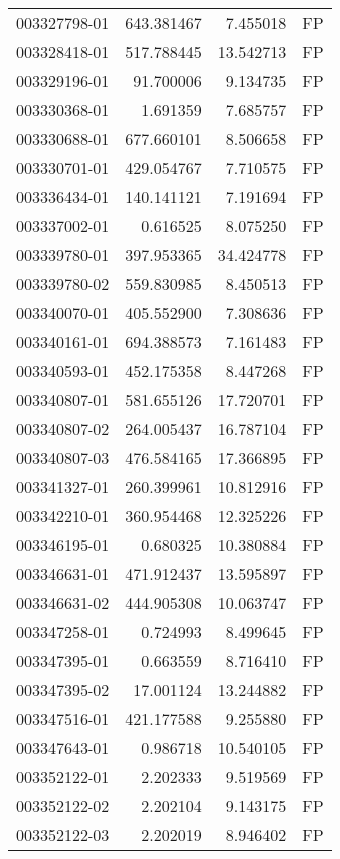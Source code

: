 \begin{tabular}{lrrl}
003327798-01 &  643.381467 &     7.455018 &   FP \\
003328418-01 &  517.788445 &    13.542713 &   FP \\
003329196-01 &   91.700006 &     9.134735 &   FP \\
003330368-01 &    1.691359 &     7.685757 &   FP \\
003330688-01 &  677.660101 &     8.506658 &   FP \\
003330701-01 &  429.054767 &     7.710575 &   FP \\
003336434-01 &  140.141121 &     7.191694 &   FP \\
003337002-01 &    0.616525 &     8.075250 &   FP \\
003339780-01 &  397.953365 &    34.424778 &   FP \\
003339780-02 &  559.830985 &     8.450513 &   FP \\
003340070-01 &  405.552900 &     7.308636 &   FP \\
003340161-01 &  694.388573 &     7.161483 &   FP \\
003340593-01 &  452.175358 &     8.447268 &   FP \\
003340807-01 &  581.655126 &    17.720701 &   FP \\
003340807-02 &  264.005437 &    16.787104 &   FP \\
003340807-03 &  476.584165 &    17.366895 &   FP \\
003341327-01 &  260.399961 &    10.812916 &   FP \\
003342210-01 &  360.954468 &    12.325226 &   FP \\
003346195-01 &    0.680325 &    10.380884 &   FP \\
003346631-01 &  471.912437 &    13.595897 &   FP \\
003346631-02 &  444.905308 &    10.063747 &   FP \\
003347258-01 &    0.724993 &     8.499645 &   FP \\
003347395-01 &    0.663559 &     8.716410 &   FP \\
003347395-02 &   17.001124 &    13.244882 &   FP \\
003347516-01 &  421.177588 &     9.255880 &   FP \\
003347643-01 &    0.986718 &    10.540105 &   FP \\
003352122-01 &    2.202333 &     9.519569 &   FP \\
003352122-02 &    2.202104 &     9.143175 &   FP \\
003352122-03 &    2.202019 &     8.946402 &   FP \\

\end{tabular}
